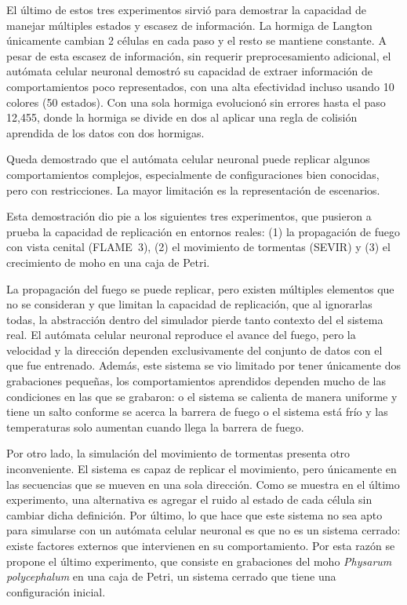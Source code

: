 El último de estos tres experimentos sirvió para demostrar la capacidad de manejar múltiples estados y escasez de información. La hormiga de Langton únicamente cambian 2 células en cada paso y el resto se mantiene constante. A pesar de esta escasez de información, sin requerir preprocesamiento adicional, el autómata celular neuronal demostró su capacidad de extraer información de comportamientos poco representados, con una alta efectividad incluso usando 10 colores (50 estados). Con una sola hormiga evolucionó sin errores hasta el paso 12,455, donde la hormiga se divide en dos al aplicar una regla de colisión aprendida de los datos con dos hormigas.

Queda demostrado que el autómata celular neuronal puede replicar algunos comportamientos complejos, especialmente de configuraciones bien conocidas, pero con restricciones. La mayor limitación es la representación de escenarios.

Esta demostración dio pie a los siguientes tres experimentos, que pusieron a prueba la capacidad de replicación en entornos reales: (1) la propagación de fuego con vista cenital (FLAME~3), (2) el movimiento de tormentas (SEVIR) y (3) el crecimiento de moho en una caja de Petri.

La propagación del fuego se puede replicar, pero existen múltiples elementos que no se consideran y que limitan la capacidad de replicación, que al ignorarlas todas, la abstracción dentro del simulador pierde tanto contexto del el sistema real. El autómata celular neuronal reproduce el avance del fuego, pero la velocidad y la dirección dependen exclusivamente del conjunto de datos con el que fue entrenado. Además, este sistema se vio limitado por tener únicamente dos grabaciones pequeñas, los comportamientos aprendidos dependen mucho de las condiciones en las que se grabaron: o el sistema se calienta de manera uniforme y tiene un salto conforme se acerca la barrera de fuego o el sistema está frío y las temperaturas solo aumentan cuando llega la barrera de fuego. 

Por otro lado, la simulación del movimiento de tormentas presenta otro inconveniente. El sistema es capaz de replicar el movimiento, pero únicamente en las secuencias que se mueven en una sola dirección. Como se muestra en el último experimento, una alternativa es agregar el ruido al estado de cada célula sin cambiar dicha definición. Por último, lo que hace que este sistema no sea apto para simularse con un autómata celular neuronal es que no es un sistema cerrado: existe factores externos que intervienen en su comportamiento. Por esta razón se propone el último experimento, que consiste en grabaciones del moho \textit{Physarum polycephalum} en una caja de Petri, un sistema cerrado que tiene una configuración inicial.

